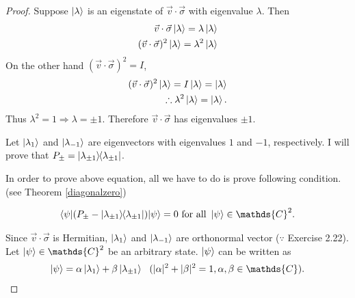 	\begin{proof}
		Suppose $\ket{\lambda}$ is an eigenstate of $\vec{v} \cdot \vec{\sigma}$ with eigenvalue $\lambda$. Then
		\begin{align*}
		\vec{v} \cdot \vec{\sigma} \ket{\lambda} = \lambda \ket{\lambda}\\
		(\vec{v} \cdot \vec{\sigma})^2 \ket{\lambda} = \lambda^2 \ket{\lambda}
		\end{align*}
		On the other hand $(\vec{v} \cdot \vec{\sigma})^2 = I$,
		\begin{align*}
		(\vec{v} \cdot \vec{\sigma})^2 \ket{\lambda} = I \ket{\lambda} = \ket{\lambda}\\
		\therefore \lambda^2\ket{\lambda} = \ket{\lambda}.
		\end{align*}
		Thus $\lambda^2 = 1 \Rightarrow \lambda = \pm 1$. Therefore $\vec{v} \cdot \vec{\sigma}$ has eigenvalues $\pm 1$.

		Let $\ket{\lambda_1}$ and $\ket{\lambda_{-1}}$ are eigenvectors with eigenvalues $1$ and $-1$, respectively.
		I will prove that $P_\pm = \ket{\lambda_{\pm 1}}\hspace{-1mm} \bra{\lambda_{\pm 1}}$.

		In order to prove above equation, all we have to do is prove following condition. (see Theorem \ref{diagonalzero})
		\begin{screen}
			\begin{align}
				\braket{\psi | (P_\pm - \kb{\lambda_{\pm 1}})| \psi} = 0 \text{ for all } \ket{\psi} \in \mathds{C}^2.
			\end{align}
		\end{screen}

		Since $\vec{v} \cdot \vec{\sigma}$ is Hermitian, $\ket{\lambda_1}$ and $\ket{\lambda_{-1}}$ are orthonormal vector ($\because $ Exercise 2.22).
		Let $\ket{\psi} \in \mathds{C}^2$ be an arbitrary state. $\ket{\psi}$ can be written as
		\begin{align*}
		\ket{\psi} = \alpha \ket{\lambda_1} + \beta \ket{\lambda_{\pm 1}} ~~(|\alpha|^2 + |\beta|^2 = 1, \alpha, \beta \in \mathds{C}).
		\end{align*}


\end{proof}
